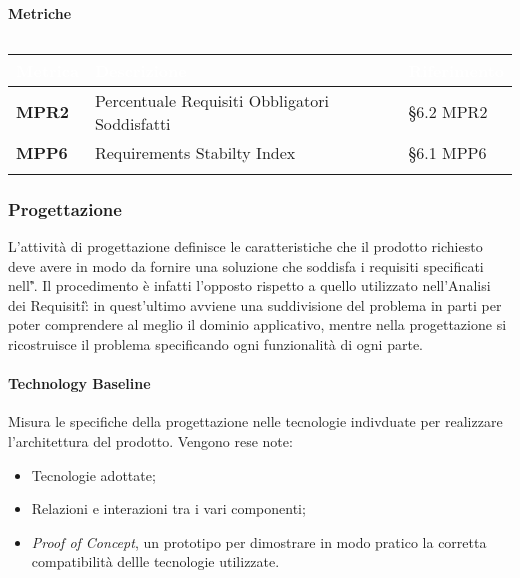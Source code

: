 \newpage

\paragraph{Metriche}
\setlength{\freewidth}{\dimexpr\textwidth-0\tabcolsep}
\renewcommand{\arraystretch}{1.5}
\setlength{\aboverulesep}{0pt}
\setlength{\belowrulesep}{0pt}
\begin{longtable}{L{.22\freewidth} L{.4\freewidth} L{.2\freewidth}}
	\toprule
	\textcolor{white}{\textbf{Metrica}}&
	\textcolor{white}{\textbf{Descrizione}}&	
	\textcolor{white}{\textbf{Riferimento}}\\	
	\toprule
	\endhead
	
	\textbf{MPR2} & Percentuale Requisiti Obbligatori Soddisfatti & \S 6.2 MPR2 \\
	\textbf{MPP6} & Requirements Stabilty Index & \S 6.1 MPP6 \\
	
	\bottomrule
	\caption*{}
\end{longtable}

\subsubsection{Progettazione} 
L'attività di progettazione definisce le caratteristiche che il prodotto richiesto deve avere in modo da fornire una soluzione che soddisfa i requisiti specificati nell'\AdR{}\textit{\G}.
Il procedimento è infatti l'opposto rispetto a quello utilizzato nell'Analisi dei Requisiti\G: in quest'ultimo avviene una suddivisione del problema in parti
per poter comprendere al meglio il dominio applicativo, mentre nella progettazione si ricostruisce il problema specificando ogni funzionalità di ogni parte.

\paragraph{Technology Baseline} \aCapo{}
Misura le specifiche della progettazione nelle tecnologie indivduate per realizzare l'architettura del prodotto. Vengono rese note:
\begin{itemize}
	\item Tecnologie adottate;
	\item Relazioni e interazioni tra i vari componenti;
	\item {\textit{Proof of Concept}}, un prototipo per dimostrare in modo pratico la corretta compatibilità  dellle tecnologie utilizzate.
\end{itemize}

